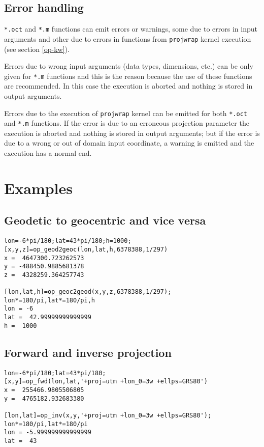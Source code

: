 \documentclass[10pt,a4paper]{article}
\begin{document}
\subsection{Error handling}

\texttt{*.oct} and \texttt{*.m} functions can emit errors or warnings, some due
to errors in input arguments and other due to errors in functions from
\texttt{projwrap} kernel execution (see section \ref{op-kw}).

Errors due to wrong input arguments (data types, dimensions, etc.) can be only
given for \texttt{*.m} functions and this is the reason because the use of these
functions are recommended. In this case the execution is aborted and nothing is
stored in output arguments.

Errors due to the execution of \texttt{projwrap} kernel can be emitted for both
\texttt{*.oct} and \texttt{*.m} functions. If the error is due to an erroneous
projection parameter the execution is aborted and nothing is stored in output
arguments; but if the error is due to a wrong or out of domain input coordinate,
a warning is emitted and the execution has a normal end.

\section{Examples}

\subsection{Geodetic to geocentric and vice versa}

\begin{verbatim}
lon=-6*pi/180;lat=43*pi/180;h=1000;
[x,y,z]=op_geod2geoc(lon,lat,h,6378388,1/297)
x =  4647300.723262573
y = -488450.9885681378
z =  4328259.364257743

[lon,lat,h]=op_geoc2geod(x,y,z,6378388,1/297);
lon*=180/pi,lat*=180/pi,h
lon = -6
lat =  42.99999999999999
h =  1000
\end{verbatim}

\subsection{Forward and inverse projection}

\begin{verbatim}
lon=-6*pi/180;lat=43*pi/180;
[x,y]=op_fwd(lon,lat,'+proj=utm +lon_0=3w +ellps=GRS80')
x =  255466.9805506805
y =  4765182.932683380

[lon,lat]=op_inv(x,y,'+proj=utm +lon_0=3w +ellps=GRS80');
lon*=180/pi,lat*=180/pi
lon = -5.999999999999999
lat =  43
\end{verbatim}
\end{document}
